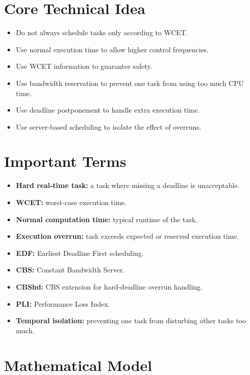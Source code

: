 \documentclass[a4paper,11pt]{article}
\begin{document}
\section*{Core Technical Idea}

\begin{itemize}
    \item Do not always schedule tasks only according to WCET.
    \item Use normal execution time to allow higher control frequencies.
    \item Use WCET information to guarantee safety.
    \item Use bandwidth reservation to prevent one task from using too much CPU time.
    \item Use deadline postponement to handle extra execution time.
    \item Use server-based scheduling to isolate the effect of overruns.
\end{itemize}

\section*{Important Terms}

\begin{itemize}
    \item \textbf{Hard real-time task:} a task where missing a deadline is unacceptable.
    \item \textbf{WCET:} worst-case execution time.
    \item \textbf{Normal computation time:} typical runtime of the task.
    \item \textbf{Execution overrun:} task exceeds expected or reserved execution time.
    \item \textbf{EDF:} Earliest Deadline First scheduling.
    \item \textbf{CBS:} Constant Bandwidth Server.
    \item \textbf{CBShd:} CBS extension for hard-deadline overrun handling.
    \item \textbf{PLI:} Performance Loss Index.
    \item \textbf{Temporal isolation:} preventing one task from disturbing other tasks too much.
\end{itemize}

\section*{Mathematical Model}
\end{document}
